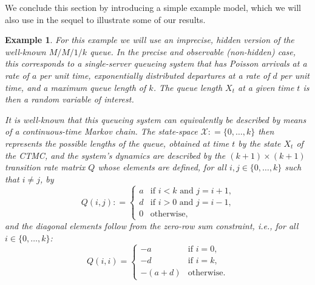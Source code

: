 \documentclass[3p]{elsarticle}
\newtheorem{example}{Example}[section]
\newcommand{\coloneqq}{:\!=}
\begin{document}
We conclude this section by introducing a simple example model, which we will also use in the sequel to illustrate some of our results.
\begin{example}\label{example:queue}
For this example we will use an imprecise, hidden version of the well-known $M/M/1/k$ queue. In the precise and observable (non-hidden) case, this corresponds to a single-server queueing system that has Poisson arrivals at a rate of $a$ per unit time, exponentially distributed departures at a rate of $d$ per unit time, and a maximum queue length of $k$. The queue length $X_t$ at a given time $t$ is then a random variable of interest.

It is well-known that this queueing system can equivalently be described by means of a continuous-time Markov chain. The state-space $\mathcal{X}\coloneqq\{0,\ldots,k\}$ then represents the possible lengths of the queue, obtained at time $t$ by the state $X_t$ of the CTMC, and the system's dynamics are described by the $(k+1)\times (k+1)$ transition rate matrix $Q$ whose elements are defined, for all $i,j\in\{0,\ldots,k\}$ such that $i\neq j$, by
\begin{equation*}
Q(i,j) \coloneqq \left\{\begin{array}{rl}
a & \text{if $i<k$ and $j=i+1$,} \\
d & \text{if $i>0$ and $j=i-1$,} \\
0 & \text{otherwise,}
\end{array}\right.
\end{equation*} 
and the diagonal elements follow from the zero-row sum constraint, i.e., for all $i\in\{0,\ldots,k\}$:
\begin{equation*}
Q(i,i) = \left\{\begin{array}{cl}
-a & \text{if $i=0$,} \\
-d & \text{if $i=k$,} \\
-(a+d) & \text{otherwise.}
\end{array}\right.
\end{equation*}


\end{example}
\end{document}
